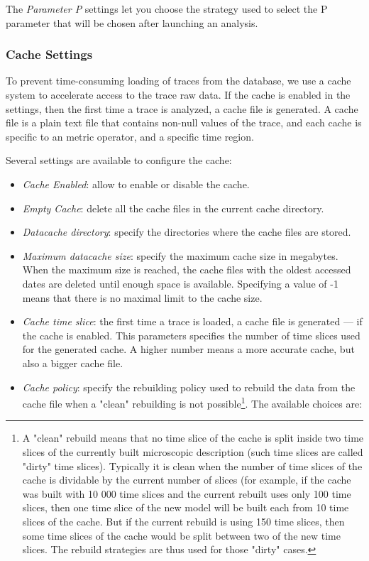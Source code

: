 \documentclass[twoside]{article}
\begin{document}
\begin{sloppypar}
The \textit{Parameter P} settings let you choose the strategy used to select the P parameter that will be chosen after launching an analysis.

\subsubsection{Cache Settings}
To prevent time-consuming loading of traces from the database, we use a cache system to accelerate access to the trace raw data. If the cache is enabled in the settings, then the first time a trace is analyzed, a cache file is generated. A cache file is a plain text file that contains non-null values of the trace, and each cache is specific to an metric operator, and a specific time region.

Several settings are available to configure the cache:
\begin{itemize}
	\item \textit{Cache Enabled}: allow to enable or disable the cache.
	\item \textit{Empty Cache}: delete all the cache files in the current cache directory.
	\item \textit{Datacache directory}: specify the directories where the cache files are stored.
	\item \textit{Maximum datacache size}: specify the maximum cache size in megabytes. When the maximum size is reached, the cache files with the oldest accessed dates are deleted until enough space is available. Specifying a value of -1 means that there is no maximal limit to the cache size.
	\item \textit{Cache time slice}: the first time a trace is loaded, a cache file is generated --- if the cache is enabled. This parameters specifies the number of time slices used for the generated cache. A higher number means a more accurate cache, but also a bigger cache file.
	\item \textit{Cache policy}: specify the rebuilding policy used to rebuild the data from the cache file when a "clean" rebuilding is not possible\footnote{A "clean" rebuild means that no time slice of the cache is split inside two time slices of the currently built microscopic description (such time slices are called "dirty" time slices). Typically it is clean when the number of time slices of the cache is dividable by the current number of slices (for example, if the cache was built with 10 000 time slices and the current rebuilt uses only 100 time slices, then one time slice of the new model will be built each from 10 time slices of the cache. But if the current rebuild is using 150 time slices, then some time slices of the cache would be split between two of the new time slices. The rebuild strategies are thus used for those "dirty" cases.}. The available choices are:

\end{itemize}
\end{sloppypar}
\end{document}
